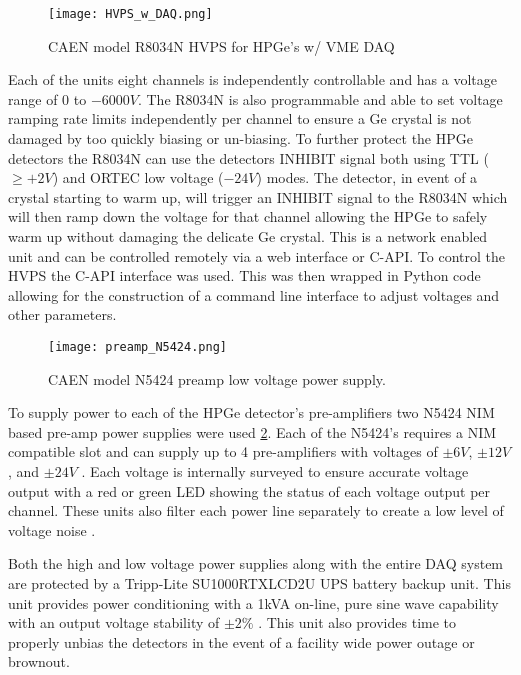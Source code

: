 \documentclass[jon_ringuette_thesis_proposal.tex]{subfiles}
\begin{document}
    \begin{figure}[H]
        \begin{center}
            \texttt{[image: HVPS\_w\_DAQ.png]}
        \end{center}
        \caption{\small CAEN model R8034N HVPS for HPGe's w/ VME DAQ}
        \label{fig:CAEN_HVPS}
    \end{figure}

    Each of the units eight channels is independently controllable and has a voltage range of 0 to $-6000V$.
    The R8034N is also programmable and able to set voltage ramping rate limits independently per channel to ensure a Ge crystal is not damaged by too quickly biasing or un-biasing.
    To further protect the HPGe detectors the R8034N can use the detectors INHIBIT signal both using TTL ($\ge +2V$) and ORTEC low voltage ($-24V$) modes.
    The detector, in event of a crystal starting to warm up, will trigger an INHIBIT signal to the R8034N which will then ramp down the voltage for that channel allowing the HPGe to safely warm up without damaging the delicate Ge crystal.
    This is a network enabled unit and can be controlled remotely via a web interface or C-API.
    To control the HVPS the C-API interface was used.
    This was then wrapped in Python code allowing for the construction of a command line interface \cite{pyhvps_software} to adjust voltages and other parameters.

    \begin{figure}[H]
        \begin{center}
            \texttt{[image: preamp\_N5424.png]}
        \end{center}
        \caption{\small CAEN model N5424 preamp low voltage power supply. \cite{CAEN_N5424}}
        \label{fig:CAEN_PREAMP_PS}
    \end{figure}

    To supply power to each of the HPGe detector's pre-amplifiers two N5424 NIM based pre-amp power supplies were used \ref{fig:CAEN_PREAMP_PS}.
    Each of the N5424's requires a NIM compatible slot and can supply up to 4 pre-amplifiers with voltages of $\pm 6V$, $\pm 12V$, and $\pm 24V$ \cite{CAEN_N5424}.
    Each voltage is internally surveyed to ensure accurate voltage output with a red or green LED showing the status of each voltage output per channel.
    These units also filter each power line separately to create a low level of voltage noise \cite{CAEN_N5424}.

    Both the high and low voltage power supplies along with the entire DAQ system are protected by a Tripp-Lite SU1000RTXLCD2U UPS battery backup unit.
    This unit provides power conditioning with a 1kVA on-line, pure sine wave capability with an output voltage stability of $\pm2\%$ \cite{Lennarz2015}.
    This unit also provides time to properly unbias the detectors in the event of a facility wide power outage or brownout.
\end{document}
